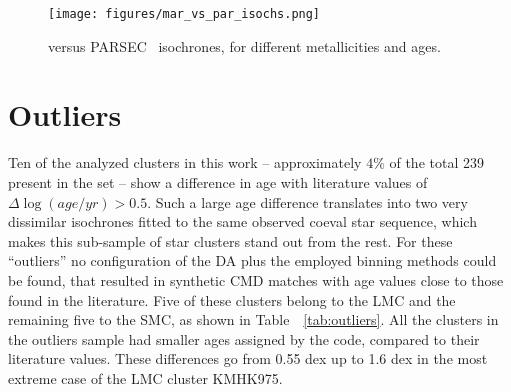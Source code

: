 \documentclass[draft]{aa}
\begin{document}
\begin{appendix}
\begin{figure*}
\texttt{[image: figures/mar\_vs\_par\_isochs.png]}
\caption{\cite{Marigo_2008} versus PARSEC~\citep{Bressan_2012} isochrones, for
different metallicities and ages.}
\label{fig:marig_parsec}
\end{figure*}





\section{Outliers}
\label{apdx:outliers}

Ten of the analyzed clusters in this work -- approximately $4\%$ of the total
239 present in the set -- show a difference in age with literature
values of $\Delta\log(age/yr){>}0.5$.
Such a large age difference translates into two very dissimilar isochrones
fitted to the same observed coeval star sequence, which makes this sub-sample of
star clusters stand out from the rest.
%
For these ``outliers'' no configuration of the DA plus the employed binning
methods could be found, that resulted in synthetic CMD matches with age values
close to those found in the literature.
%
Five of these clusters belong to the LMC and the remaining five to the SMC,
as shown in Table~~\ref{tab:outliers}.
All the clusters in the outliers sample had smaller ages assigned by the code,
compared to their literature values. These differences go from 0.55
dex up to 1.6 dex in the most extreme case of the LMC cluster KMHK975.


\end{appendix}
\end{document}
